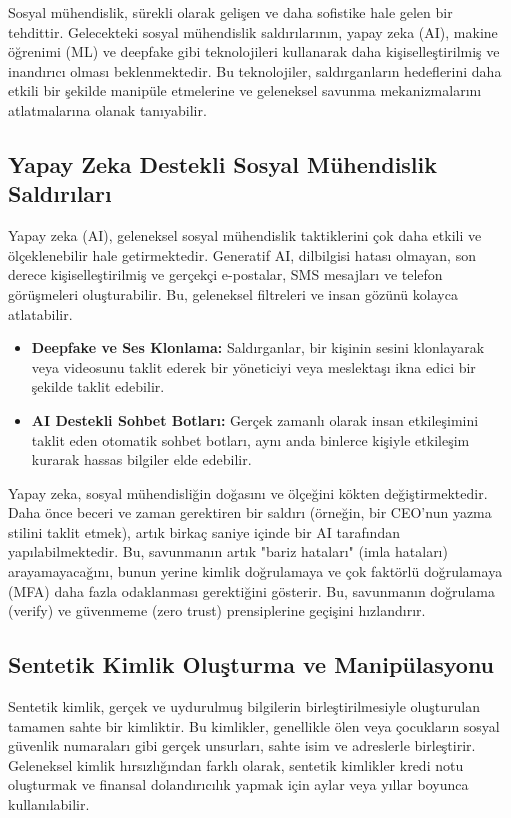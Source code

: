 Sosyal mühendislik, sürekli olarak gelişen ve daha sofistike hale gelen bir tehdittir. Gelecekteki sosyal mühendislik saldırılarının, yapay zeka (AI), makine öğrenimi (ML) ve deepfake gibi teknolojileri kullanarak daha kişiselleştirilmiş ve inandırıcı olması beklenmektedir. Bu teknolojiler, saldırganların hedeflerini daha etkili bir şekilde manipüle etmelerine ve geleneksel savunma mekanizmalarını atlatmalarına olanak tanıyabilir.

\subsection{Yapay Zeka Destekli Sosyal Mühendislik Saldırıları}

Yapay zeka (AI), geleneksel sosyal mühendislik taktiklerini çok daha etkili ve ölçeklenebilir hale getirmektedir. Generatif AI, dilbilgisi hatası olmayan, son derece kişiselleştirilmiş ve gerçekçi e-postalar, SMS mesajları ve telefon görüşmeleri oluşturabilir. Bu, geleneksel filtreleri ve insan gözünü kolayca atlatabilir.
\begin{itemize}
    \item \textbf{Deepfake ve Ses Klonlama:} Saldırganlar, bir kişinin sesini klonlayarak veya videosunu taklit ederek bir yöneticiyi veya meslektaşı ikna edici bir şekilde taklit edebilir.
    \item \textbf{AI Destekli Sohbet Botları:} Gerçek zamanlı olarak insan etkileşimini taklit eden otomatik sohbet botları, aynı anda binlerce kişiyle etkileşim kurarak hassas bilgiler elde edebilir.
\end{itemize}

Yapay zeka, sosyal mühendisliğin doğasını ve ölçeğini kökten değiştirmektedir. Daha önce beceri ve zaman gerektiren bir saldırı (örneğin, bir CEO'nun yazma stilini taklit etmek), artık birkaç saniye içinde bir AI tarafından yapılabilmektedir. Bu, savunmanın artık "bariz hataları" (imla hataları) arayamayacağını, bunun yerine kimlik doğrulamaya ve çok faktörlü doğrulamaya (MFA) daha fazla odaklanması gerektiğini gösterir. Bu, savunmanın doğrulama (verify) ve güvenmeme (zero trust) prensiplerine geçişini hızlandırır.

\subsection{Sentetik Kimlik Oluşturma ve Manipülasyonu}

Sentetik kimlik, gerçek ve uydurulmuş bilgilerin birleştirilmesiyle oluşturulan tamamen sahte bir kimliktir. Bu kimlikler, genellikle ölen veya çocukların sosyal güvenlik numaraları gibi gerçek unsurları, sahte isim ve adreslerle birleştirir. Geleneksel kimlik hırsızlığından farklı olarak, sentetik kimlikler kredi notu oluşturmak ve finansal dolandırıcılık yapmak için aylar veya yıllar boyunca kullanılabilir.

